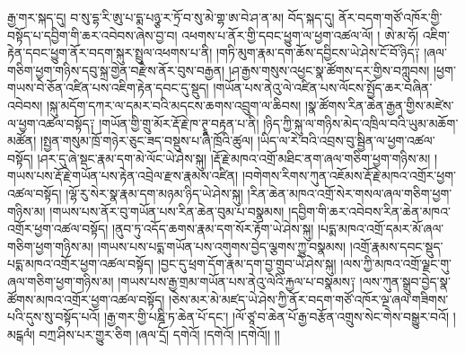 \setcounter{footnote}{0} 
རྒྱ་གར་སྐད་དུ། བ་སུ་དྷ་རི་ཨུ་པ་དྨ་པཉྩ་ར་ཏྲོ་བ་སུ་མེ་གྷ་ཨ་བེ་ཤ་ན་མ། བོད་སྐད་དུ། ནོར་བདག་གཙོ་འཁོར་གྱི་བསྟོད་པ་དབྱིག་གི་ཆར་འབེབས་ཞེས་བྱ་བ། འཕགས་པ་ནོར་གྱི་དབང་ཕྱུག་ལ་ཕྱག་འཚལ་ལོ། ། ཨེ་མ་ཧོ། འཇིག་རྟེན་དབང་ཕྱུག་ནོར་བདག་སྐུར་སྤྲུལ་འཕགས་པ་ནི། །གཏི་མུག་རྣམ་དག་ཆོས་དབྱིངས་ཡེ་ཤེས་ངོ་བོ་ཉིད༑ །ཞལ་གཅིག་ཕྱག་གཉིས་དབུ་སྐྲ་གྱེན་བརྫེས་ནོར་བུས་བརྒྱན། །ཤ་རྒྱས་གསུས་འཕྱང་སྣ་ཚོགས་དར་གྱིས་བཀླུབས། །ཕྱག་གཡས་བེ་ཅོན་འཛིན་པས་འཇིག་རྟེན་དབང་དུ་སྡུད། །གཡོན་པས་ནེའུ་ལེ་འཛིན་པས་ལོངས་སྤྱོད་ཆར་བཞིན་འབེབས། །སྐུ་མདོག་དཀར་ལ་དམར་བའི་མདངས་ཆགས་འབྲུག་ལ་ཆིབས། །སྣ་ཚོགས་རིན་ཆེན་རྒྱན་གྱིས་མཛེས་ལ་ཕྱག་འཚལ་བསྟོད༑ །གཡོན་གྱི་གྲུ་མོར་རྡོ་རྗེ་ཁ་ཊྭཱ་བརྟན་པ་ནི། །ཉིད་ཀྱི་སྐུ་ལ་གཉིས་མེད་འཁྲིལ་བའི་ཡུམ་མཆོག་མཚོན། །སྤྱན་གསུམ་ཁྲོ་གཉེར་ཅུང་ཟད་བསྡུས་པ་ཞི་ཁྲོའི་ཚུལ། །ཡིད་ལ་རེ་བའི་འབྲས་བུ་སྦྱིན་ལ་ཕྱག་འཚལ་བསྟོད། །ཤར་དུ་ཞེ་སྡང་རྣམ་དག་མེ་ལོང་ཡེ་ཤེས་སྐུ། །རྡོ་རྗེ་མཁའ་འགྲོ་མཐིང་ནག་ཞལ་གཅིག་ཕྱག་གཉིས་མ། །གཡས་པས་རྡོ་རྗེ་གཡོན་པས་རྟེན་འབྲེལ་རྫས་རྣམས་འཛིན། །བགེགས་རིགས་ཀུན་འཇོམས་རྡོ་རྗེ་མཁའ་འགྲོར་ཕྱག་འཚལ་བསྟོད། །ལྷོ་རུ་སེར་སྣ་རྣམ་དག་མཉམ་ཉིད་ཡེ་ཤེས་སྐུ། །རིན་ཆེན་མཁའ་འགྲོ་སེར་གསལ་ཞལ་གཅིག་ཕྱག་གཉིས་མ། །གཡས་པས་ནོར་བུ་གཡོན་པས་རིན་ཆེན་བུམ་པ་བསྣམས། །དབྱིག་གི་ཆར་འབེབས་རིན་ཆེན་མཁའ་འགྲོར་ཕྱག་འཚལ་བསྟོད། །ནུབ་ཏུ་འདོད་ཆགས་རྣམ་དག་སོར་རྟོག་ཡེ་ཤེས་སྐུ། །པདྨ་མཁའ་འགྲོ་དམར་མོ་ཞལ་གཅིག་ཕྱག་གཉིས་མ། །གཡས་པས་པདྨ་གཡོན་པས་འགུགས་བྱེད་ལྕགས་ཀྱུ་བསྣམས། །འགྲོ་རྣམས་དབང་སྡུད་པདྨ་མཁའ་འགྲོར་ཕྱག་འཚལ་བསྟོད། །བྱང་དུ་ཕྲག་དོག་རྣམ་དག་བྱ་གྲུབ་ཡེ་ཤེས་སྐུ། །ལས་ཀྱི་མཁའ་འགྲོ་ལྗང་གུ་ཞལ་གཅིག་ཕྱག་གཉིས་མ། །གཡས་པས་རྒྱ་གྲམ་གཡོན་པས་ནེའུ་ལེའི་རྐྱལ་པ་བསྣམས༑ །ལས་ཀུན་སྒྲུབ་བྱེད་སྣ་ཚོགས་མཁའ་འགྲོར་ཕྱག་འཚལ་བསྟོད། །ཅེས་མར་མེ་མཛད་ཡེ་ཤེས་ཀྱི་ནོར་བདག་གཙོ་འཁོར་ལྔ་ཞལ་གཟིགས་པའི་དུས་སུ་བསྟོད་པའོ། །རྒྱ་གར་གྱི་པཎྜི་ཏ་ཆེན་པོ་དང་། །ལོ་ཙཱ་བ་ཆེན་པོ་རྒྱ་བརྩོན་འགྲུས་སེང་གེས་བསྒྱུར་བའོ། །མངྒལཾ། བཀྲ་ཤིས་པར་གྱུར་ཅིག །ཞལ་དྲོ། དགེའོ། །དགེའོ། །དགེའོ།། །།